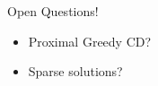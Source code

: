 \documentclass{beamer}
\begin{document}
\begin{frame}
  {
    \begin{center}
      \Huge Open Questions!
    \end{center}
  }

  \vspace{-1em}

  \Huge
  \begin{itemize}
  \item Proximal Greedy CD?
  \item Sparse solutions?
  \end{itemize}

\end{frame}








\end{document}
